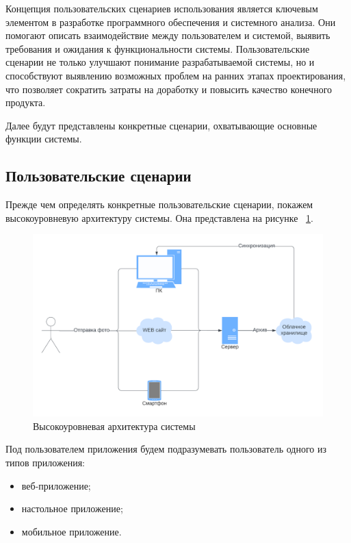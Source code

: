 Концепция пользовательских сценариев использования является ключевым элементом в разработке программного обеспечения и системного анализа. 
Они помогают описать взаимодействие между пользователем и системой, выявить требования и ожидания к функциональности системы. 
Пользовательские сценарии не только улучшают понимание разрабатываемой системы, но и способствуют выявлению возможных проблем на ранних этапах проектирования, что позволяет сократить затраты на доработку и повысить качество конечного продукта.

Далее будут представлены конкретные сценарии, охватывающие основные функции системы.
\subsection{Пользовательские сценарии}
Прежде чем определять конкретные пользовательские сценарии, покажем высокоуровневую архитектуру системы. Она представлена на рисунке ~\ref{sys_architecture}.

\begin{figure}
    \includegraphics[scale=0.5]{img/use_cases/architecture.png}
    \caption{Высокоуровневая архитектура системы}
    \label{sys_architecture}
\end{figure}

Под пользователем приложения будем подразумевать пользователь одного из типов приложения:
\begin{itemize}
    \item веб-приложение;
    \item настольное приложение;
    \item мобильное приложение.
\end{itemize}

